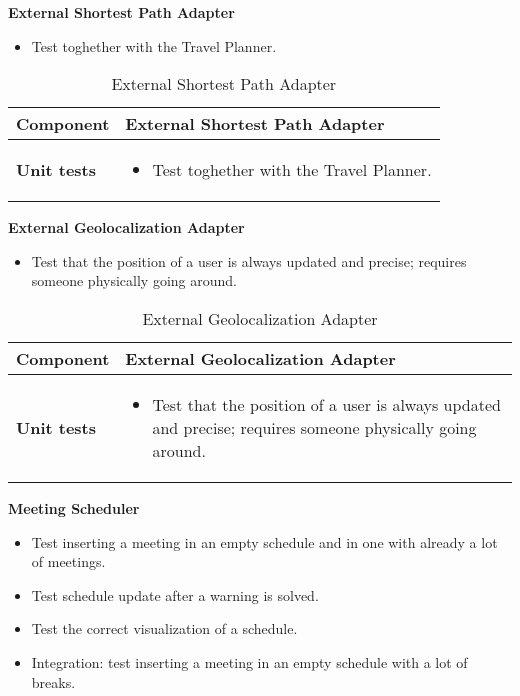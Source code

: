 \textbf{External Shortest Path Adapter}

\begin{itemize}
\item Test toghether with the Travel Planner.
\end{itemize}

\begin{table}[H]	
	\centering
	\def\arraystretch{1.5}
	\begin{tabular}{|m{4cm}|m{12cm}|}
		\hline
		\textbf{Component} & External Shortest Path Adapter \\ \hline
		\textbf{Unit tests} & 
			\begin{itemize}
			\item Test toghether with the Travel Planner.
			\end{itemize} \\ \hline
	\end{tabular}
	\caption{External Shortest Path Adapter}
\end{table}

\textbf{External Geolocalization Adapter}

\begin{itemize}
\item Test that the position of a user is always updated and precise; requires someone physically going around.
\end{itemize}

\begin{table}[H]	
	\centering
	\def\arraystretch{1.5}
	\begin{tabular}{|m{4cm}|m{12cm}|}
		\hline
		\textbf{Component} & External Geolocalization Adapter \\ \hline
		\textbf{Unit tests} & 
			\begin{itemize}
			\item Test that the position of a user is always updated and precise; requires someone physically going around.
			\end{itemize} \\ \hline
	\end{tabular}
	\caption{External Geolocalization Adapter}
\end{table}

\textbf{Meeting Scheduler}

\begin{itemize}
\item Test inserting a meeting in an empty schedule and in one with already a lot of meetings.
\item Test schedule update after a warning is solved.
\item Test the correct visualization of a schedule.
\item Integration: test inserting a meeting in an empty schedule with a lot of breaks.
\end{itemize}

